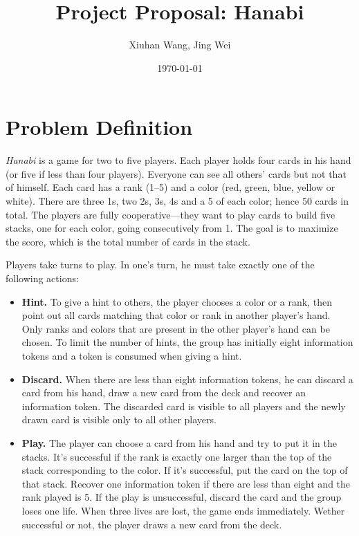 \documentclass[11pt]{article}
\begin{document}
\title{\bf Project Proposal: Hanabi}
\author{Xiuhan Wang, Jing Wei}
\date{\today}
\maketitle

\section{Problem Definition}

\textsl{Hanabi} is a game for two to five players. Each player holds four cards in his hand (or five if less than four players). Everyone can see all others' cards but not that of himself. Each card has a rank (1--5) and a color (red, green, blue, yellow or white). There are three 1s, two 2s, 3s, 4s and a 5 of each color; hence 50 cards in total. The players are fully cooperative---they want to play cards to build five stacks, one for each color, going consecutively from 1. The goal is to maximize the score, which is the total number of cards in the stack.

Players take turns to play. In one's turn, he must take exactly one of the following actions:

\begin{itemize}
\item \vspace{-1.2ex} \textbf{Hint.} To give a hint to others, the player chooses a color or a rank, then point out all cards matching that color or rank in another player's hand. Only ranks and colors that are present in the other player's hand can be chosen. To limit the number of hints, the group has initially eight information tokens and a token is consumed when giving a hint.
\item \vspace{-1.5ex} \textbf{Discard.} When there are less than eight information tokens, he can discard a card from his hand, draw a new card from the deck and recover an information token. The discarded card is visible to all players and the newly drawn card is visible only to all other players.
\item \vspace{-1.5ex} \textbf{Play.} The player can choose a card from his hand and try to put it in the stacks. It's successful if the rank is exactly one larger than the top of the stack corresponding to the color. If it's successful, put the card on the top of that stack. Recover one information token if there are less than eight and the rank played is 5. If the play is unsuccessful, discard the card and the group loses one life. When three lives are lost, the game ends immediately. Wether successful or not, the player draws a new card from the deck.
\vspace{-1.5ex}
\end{itemize}
\end{document}
